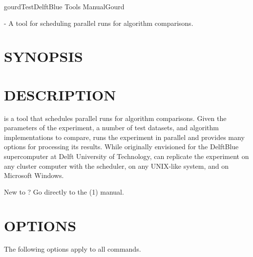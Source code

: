 \documentclass[a4paper,english]{article}
\begin{document}
    \pagestyle{fancy}



    \begin{Name}{1}{gourd}{Test}{DelftBlue Tools Manual}{Gourd}

         - A tool for scheduling parallel runs for algorithm comparisons.

    \end{Name}
    \section{SYNOPSIS}

              

    \section{DESCRIPTION}

         is a tool that schedules parallel runs for algorithm comparisons.
        Given the parameters of the experiment, a number of test datasets, and algorithm implementations to compare,
         runs the experiment in parallel and provides many options for processing its results.
        While originally envisioned for the DelftBlue supercomputer at Delft University of Technology,
         can replicate the experiment on any cluster computer with the  scheduler,
        on any UNIX-like system, and on Microsoft Windows.

        New to ? Go directly to the (1) manual.

    \section{OPTIONS}

        The following options apply to all  commands.
\end{document}
